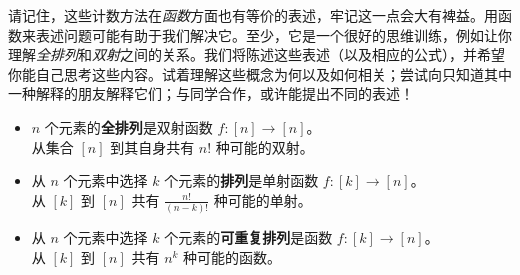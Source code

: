 请记住，这些计数方法在\emph{函数}方面也有等价的表述，牢记这一点会大有裨益。用函数来表述问题可能有助于我们解决它。至少，它是一个很好的思维训练，例如让你理解\emph{全排列}和\emph{双射}之间的关系。我们将陈述这些表述（以及相应的公式），并希望你能自己思考这些内容。试着理解这些概念为何以及如何相关；尝试向只知道其中一种解释的朋友解释它们；与同学合作，或许能提出不同的表述！

\begin{itemize}
    \item $n$ 个元素的\textbf{全排列}是双射函数 $f : [n] \to [n]$。\\
          从集合 $[n]$ 到其自身共有 $n!$ 种可能的双射。
    \item 从 $n$ 个元素中选择 $k$ 个元素的\textbf{排列}是单射函数 $f : [k] \to [n]$。\\
          从 $[k]$ 到 $[n]$ 共有 $\frac{n!}{(n-k)!}$ 种可能的单射。
    \item 从 $n$ 个元素中选择 $k$ 个元素的\textbf{可重复排列}是函数 $f : [k] \to [n]$。 \\
          从 $[k]$ 到 $[n]$ 共有 $n^k$ 种可能的函数。
\end{itemize}